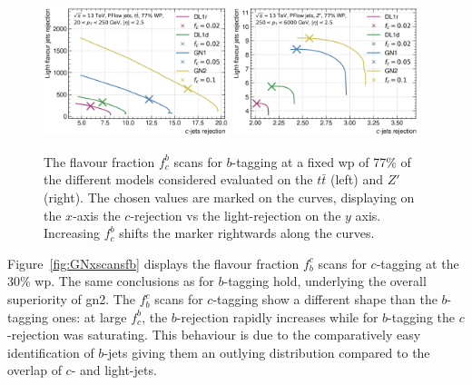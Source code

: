 \begin{figure}[h!]
  \centering
  \includegraphics[width=0.48\textwidth]{Images/FTAG/GN/GN2/fraction_scans/FractionScanPlot_tt.png}
  \includegraphics[width=0.48\textwidth]{Images/FTAG/GN/GN2/fraction_scans/FractionScanPlot_zp.png}
  \caption{The flavour fraction $f^b_c$ scans for $b$-tagging at a fixed \gls{wp} of 77\% of the different models considered evaluated on the $t\bar{t}$ (left) and $Z'$ (right). The chosen values are marked on the curves, displaying on the $x$-axis the $c$-rejection vs the light-rejection on the $y$ axis. Increasing $f^b_c$ shifts the marker rightwards along the curves. }
  \label{fig:GNxscansfc}
\end{figure} 

Figure~\ref{fig:GNxscansfb} displays the flavour fraction $f^c_b$ scans for $c$-tagging at the 30\% \gls{wp}. The same conclusions as for $b$-tagging hold, underlying the overall superiority of \gls{gn2}. The $f_b^c$ scans for $c$-tagging show a different shape than the $b$-tagging ones: at large $f^b_c$, the $b$-rejection rapidly increases while for $b$-tagging the $c$-rejection was saturating. This behaviour is due to the comparatively easy identification of $b$-jets giving them an outlying distribution compared to the overlap of $c$- and light-jets. \\


